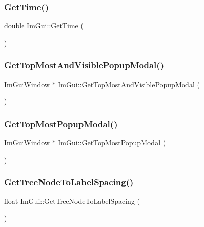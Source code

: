 \subsubsection{\texorpdfstring{Get\+Time()}{GetTime()}}
{\footnotesize\ttfamily double Im\+Gui\+::\+Get\+Time (\begin{DoxyParamCaption}{ }\end{DoxyParamCaption})}

\mbox{\label{namespaceImGui_aa7d414ea51c3150247c49902b292886c}} 
\subsubsection{\texorpdfstring{Get\+Top\+Most\+And\+Visible\+Popup\+Modal()}{GetTopMostAndVisiblePopupModal()}}
{\footnotesize\ttfamily \hyperlink{structImGuiWindow}{Im\+Gui\+Window} $\ast$ Im\+Gui\+::\+Get\+Top\+Most\+And\+Visible\+Popup\+Modal (\begin{DoxyParamCaption}{ }\end{DoxyParamCaption})}

\mbox{\label{namespaceImGui_a6b905269b079f5e07755db52cc6e52df}} 
\subsubsection{\texorpdfstring{Get\+Top\+Most\+Popup\+Modal()}{GetTopMostPopupModal()}}
{\footnotesize\ttfamily \hyperlink{structImGuiWindow}{Im\+Gui\+Window} $\ast$ Im\+Gui\+::\+Get\+Top\+Most\+Popup\+Modal (\begin{DoxyParamCaption}{ }\end{DoxyParamCaption})}

\mbox{\label{namespaceImGui_a5c89cb6b42296d0f7db75027efc0fb7a}} 
\subsubsection{\texorpdfstring{Get\+Tree\+Node\+To\+Label\+Spacing()}{GetTreeNodeToLabelSpacing()}}
{\footnotesize\ttfamily float Im\+Gui\+::\+Get\+Tree\+Node\+To\+Label\+Spacing (\begin{DoxyParamCaption}{ }\end{DoxyParamCaption})}

